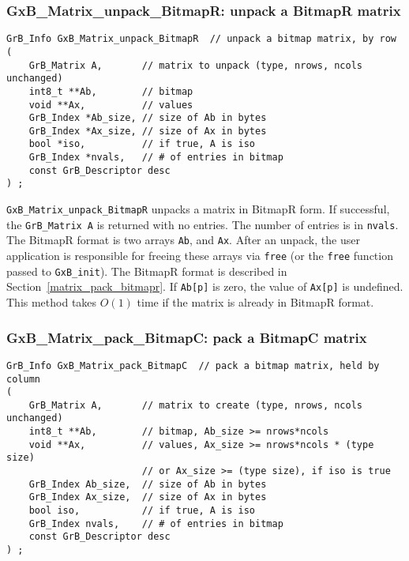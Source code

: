 \documentclass[12pt]{article}
\begin{document}
\newpage
\subsubsection{{\sf GxB\_Matrix\_unpack\_BitmapR:} unpack a BitmapR matrix}
\label{matrix_unpack_bitmapr}

\begin{mdframed}[userdefinedwidth=6in]
{\footnotesize
\begin{verbatim}
GrB_Info GxB_Matrix_unpack_BitmapR  // unpack a bitmap matrix, by row
(
    GrB_Matrix A,       // matrix to unpack (type, nrows, ncols unchanged)
    int8_t **Ab,        // bitmap
    void **Ax,          // values
    GrB_Index *Ab_size, // size of Ab in bytes
    GrB_Index *Ax_size, // size of Ax in bytes
    bool *iso,          // if true, A is iso
    GrB_Index *nvals,   // # of entries in bitmap
    const GrB_Descriptor desc
) ;
\end{verbatim}
} \end{mdframed}

\verb'GxB_Matrix_unpack_BitmapR' unpacks a matrix in BitmapR form.
If successful, the \verb'GrB_Matrix A' is returned with no entries.
The number of entries is in \verb'nvals'.
The BitmapR format is two arrays \verb'Ab', and \verb'Ax'.  After an
unpack, the user application is responsible for freeing these
arrays via \verb'free' (or the \verb'free' function passed to \verb'GxB_init').
The BitmapR format is described in Section~\ref{matrix_pack_bitmapr}.
If \verb'Ab[p]' is zero, the value of \verb'Ax[p]' is undefined.
This method takes $O(1)$ time if the matrix is already in BitmapR format.

\newpage
\subsubsection{{\sf GxB\_Matrix\_pack\_BitmapC:} pack a BitmapC matrix}
\label{matrix_pack_bitmapc}

\begin{mdframed}[userdefinedwidth=6in]
{\footnotesize
\begin{verbatim}
GrB_Info GxB_Matrix_pack_BitmapC  // pack a bitmap matrix, held by column
(
    GrB_Matrix A,       // matrix to create (type, nrows, ncols unchanged)
    int8_t **Ab,        // bitmap, Ab_size >= nrows*ncols
    void **Ax,          // values, Ax_size >= nrows*ncols * (type size)
                        // or Ax_size >= (type size), if iso is true
    GrB_Index Ab_size,  // size of Ab in bytes
    GrB_Index Ax_size,  // size of Ax in bytes
    bool iso,           // if true, A is iso
    GrB_Index nvals,    // # of entries in bitmap
    const GrB_Descriptor desc
) ;
\end{verbatim}
} \end{mdframed}
\end{document}
